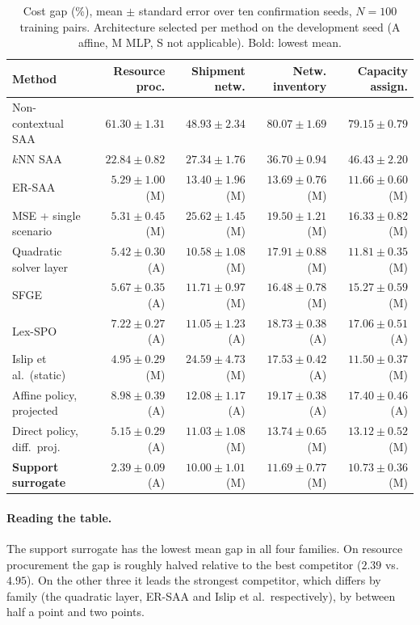 \documentclass[11pt,a4paper]{article}
\theoremstyle{remark}
\begin{document}
\begin{table}[h]
\centering\small
\caption{Cost gap (\%), mean $\pm$ standard error over ten confirmation seeds,
$N=100$ training pairs. Architecture selected per method on the development
seed (A affine, M MLP, S not applicable). Bold: lowest mean.}\label{tab:v1}
\begin{tabular}{@{}lrrrr@{}}
\toprule
Method & Resource proc. & Shipment netw. & Netw. inventory & Capacity assign.\\
\midrule
Non-contextual SAA & $61.30\pm1.31$ & $48.93\pm2.34$ & $80.07\pm1.69$ & $79.15\pm0.79$\\
$k$NN SAA & $22.84\pm0.82$ & $27.34\pm1.76$ & $36.70\pm0.94$ & $46.43\pm2.20$\\
ER-SAA & $5.29\pm1.00$ (M) & $13.40\pm1.96$ (M) & $13.69\pm0.76$ (M) & $11.66\pm0.60$ (M)\\
MSE + single scenario & $5.31\pm0.45$ (M) & $25.62\pm1.45$ (M) & $19.50\pm1.21$ (M) & $16.33\pm0.82$ (M)\\
Quadratic solver layer & $5.42\pm0.30$ (A) & $10.58\pm1.08$ (M) & $17.91\pm0.88$ (M) & $11.81\pm0.35$ (M)\\
SFGE & $5.67\pm0.35$ (A) & $11.71\pm0.97$ (M) & $16.48\pm0.78$ (M) & $15.27\pm0.59$ (M)\\
Lex-SPO & $7.22\pm0.27$ (A) & $11.05\pm1.23$ (A) & $18.73\pm0.38$ (A) & $17.06\pm0.51$ (A)\\
Islip et al.\ (static) & $4.95\pm0.29$ (M) & $24.59\pm4.73$ (M) & $17.53\pm0.42$ (A) & $11.50\pm0.37$ (M)\\
Affine policy, projected & $8.98\pm0.39$ (A) & $12.08\pm1.17$ (A) & $19.17\pm0.38$ (A) & $17.40\pm0.46$ (A)\\
Direct policy, diff.\ proj. & $5.15\pm0.29$ (A) & $11.03\pm1.08$ (M) & $13.74\pm0.65$ (M) & $13.12\pm0.52$ (M)\\
\midrule
\textbf{Support surrogate} & $\mathbf{2.39\pm0.09}$ (A) & $\mathbf{10.00\pm1.01}$ (M) & $\mathbf{11.69\pm0.77}$ (M) & $\mathbf{10.73\pm0.36}$ (M)\\
\bottomrule
\end{tabular}
\end{table}

\paragraph{Reading the table.}
The support surrogate has the lowest mean gap in all four families. On
resource procurement the gap is roughly halved relative to the best competitor
($2.39$ vs.\ $4.95$). On the other three it leads the strongest competitor,
which differs by family (the quadratic layer, ER-SAA and Islip et al.\
respectively), by between half a point and two points.
\end{document}

